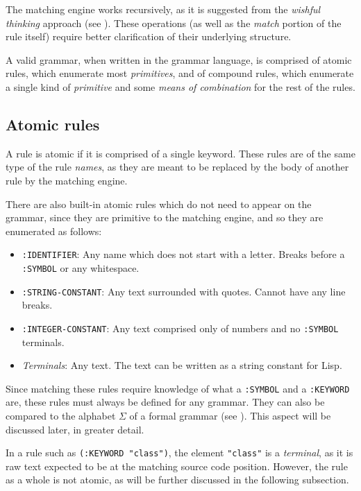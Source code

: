 \documentclass[a4paper,11pt,oneside]{article}
\begin{document}
The matching engine works recursively, as it is suggested from the
\emph{wishful thinking} approach (see \cite{sicp}).
These operations (as well as the \emph{match} portion of the rule itself)
require better clarification of their underlying structure.

A valid grammar, when written in the grammar language, is comprised of
atomic rules, which enumerate most \emph{primitives}, and of compound rules,
which enumerate a single kind of \emph{primitive} and some \emph{means of
combination} for the rest of the rules.

\subsection*{Atomic rules}
\label{sec:orge9a292c}

A rule is atomic if it is comprised of a single keyword. These rules
are of the same type of the rule \emph{names}, as they are meant to be
replaced by the body of another rule by the matching engine.

There are also built-in atomic rules which do not need to appear on
the grammar, since they are primitive to the matching engine, and so
they are enumerated as follows:

\begin{itemize}
\item \texttt{:IDENTIFIER}: Any name which does not start with a letter. Breaks
before a \texttt{:SYMBOL} or any whitespace.
\item \texttt{:STRING-CONSTANT}: Any text surrounded with quotes. Cannot have any
line breaks.
\item \texttt{:INTEGER-CONSTANT}: Any text comprised only of numbers and no
\texttt{:SYMBOL} terminals.
\item \emph{Terminals}: Any text. The text can be written as a string constant
for Lisp.
\end{itemize}

Since matching these rules require knowledge of what a \texttt{:SYMBOL} and a
\texttt{:KEYWORD} are, these rules must always be defined for any grammar. They
can also be compared to the alphabet \(\Sigma\) of a formal grammar
(see \cite{newton2006}). This aspect will be discussed later, in greater
detail.

In a rule such as \texttt{(:KEYWORD "class")}, the element \texttt{"class"} is a
\emph{terminal}, as it is raw text expected to be at the matching source code
position. However, the rule as a whole is not atomic, as will be
further discussed in the following subsection.
\end{document}
